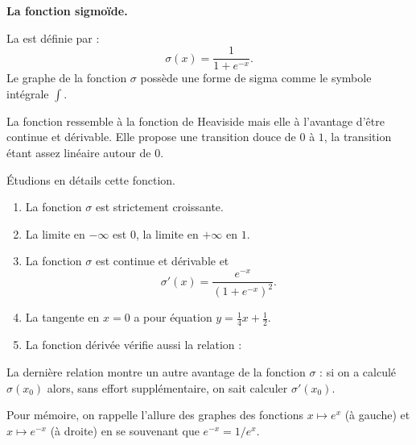 \documentclass[11pt,class=report,crop=false]{standalone}
\begin{document}



\bigskip
\textbf{La fonction sigmoïde.}

La  est définie par :
$$\sigma(x) = \frac{1}{1+e^{-x}}.$$
Le graphe de la fonction $\sigma$ possède une forme de \og{}sigma\fg{} comme le symbole intégrale $\int$.



La fonction ressemble à la fonction de Heaviside mais elle à l'avantage d'être continue et dérivable. Elle propose une transition douce de $0$ à $1$, la transition étant assez linéaire 
autour de $0$.

Étudions en détails cette fonction.
\begin{proposition}
\sauteligne
\begin{enumerate}
  \item La fonction $\sigma$ est strictement croissante.
  \item La limite en $-\infty$ est $0$, la limite en $+\infty$ en $1$.
  \item La fonction $\sigma$ est continue et dérivable et 
  $$\sigma'(x) = \frac{e^{-x}}{(1+e^{-x})^2}.$$
  \item La tangente en $x=0$ a pour équation $y=\frac14x+\frac12$.
  \item La fonction dérivée vérifie aussi la relation :
\end{enumerate}
\end{proposition}
La dernière relation montre un autre avantage de la fonction $\sigma$ : si on a calculé $\sigma(x_0)$ alors, sans effort supplémentaire, on sait calculer $\sigma'(x_0)$.

Pour mémoire, on rappelle l'allure des graphes des fonctions $x\mapsto e^x$ (à gauche) et $x\mapsto e^{-x}$ (à droite) en se souvenant que $e^{-x} = 1/e^x$.

\end{document}
